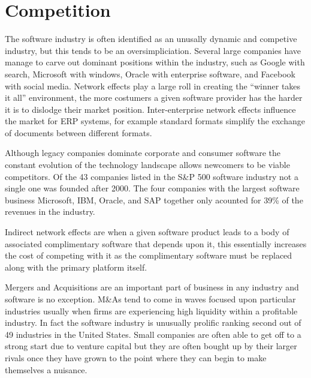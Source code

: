\section*{Competition}

The software industry is often identified as an unusally dynamic and competive industry, but this tends to be an oversimpliciation. Several large companies have manage to carve out dominant positions within the industry, such as Google with search, Microsoft with windows, Oracle with enterprise software, and Facebook with social media.\autocite[34]{IndustrySurveysInternet}
Network effects play a large roll in creating the ``winner takes it all'' environment, the more costumers a given software provider has the harder it is to dislodge their market position.\autocite[21]{buxmann2012software}
Inter-enterprise network effects influence the market for ERP systems, for example standard formats simplify the exchange of documents between different formats.\autocite[21]{buxmann2012software}

Although legacy companies dominate corporate and consumer software the constant evolution of the technology landscape allows newcomers to be viable competitors.\autocite[38]{SurveysSoftware2015}
Of the 43 companies listed in the S\&P 500 software industry not a single one was founded after 2000.\autocite[38]{SurveysSoftware2015}
The four companies with the largest software business Microsoft, IBM, Oracle, and SAP together only acounted for 39\% of the revenues in the industry.\autocite[38]{SurveysSoftware2015}

Indirect network effects are when a given software product leads to a body of associated complimentary software that depends upon it, this essentially increases the cost of competing with it as the complimentary software must be replaced along with the primary platform itself.\autocite[21]{buxmann2012software}

Mergers and Acquisitions are an important part of business in any industry and software is no exception.\autocite[421]{schief2013mergers}
M\&As tend to come in waves focused upon particular industries usually when firms are experiencing high liquidity within a profitable industry.\autocite[421]{schief2013mergers}
In fact the software industry is unusually prolific ranking second out of 49 industries in the United States.\autocite[421]{schief2013mergers}
Small companies are often able to get off to a strong start due to venture capital but they are often bought up by their larger rivals once they have grown to the point where they can begin to make themselves a nuisance. \autocite[]{LargeParadigmShiftCloudComputing}

